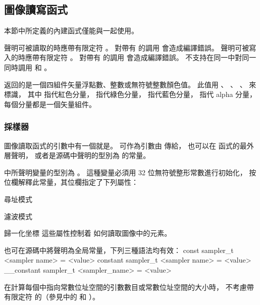 \subsection[section:imgRwFunc]{圖像讀寫函式}

本節中所定義的內建函式僅能與一起使用。

聲明可被讀取的時應帶有限定符 。
對帶有  的調用  會造成編譯錯誤。
聲明可被寫入的時應帶有限定符 。
對帶有  的調用  會造成編譯錯誤。
不支持在同一中對同一
同時調用  和 。

 返回的是一個四組件矢量浮點數、整數或無符號整數顏色值。
此值用 、 、 、  來標識，
其中  指代紅色分量，  指代綠色分量，  指代藍色分量，
  指代 alpha 分量，每個分量都是一個矢量組件。

\subsubsection[section:samplerInImgRw]{採樣器}

圖像讀取函式的引數中有一個就是。
可作為引數由  傳給，
也可以在  函式的最外層聲明，
或者是源碼中聲明的型別為  的常量。

中所聲明變量的型別為 。
這種變量必須用 32 位無符號整形常數進行初始化，
按位欄解釋此常量，其位欄指定了下列屬性：
\startigBase[indentnext=no]
\item 尋址模式
\item 濾波模式
\item 歸一化坐標
\stopigBase
這些屬性控制着  如何讀取圖像中的元素。

也可在源碼中將聲明為全局常量，下列三種語法均有效：
\startclc
const sampler_t		<sampler name> = <value>
constant sampler_t	<sampler name> = <value>
__constant sampler_t	<sampler_name> = <value>
\stopclc

\startnotepar
在計算每個中指向常數位址空間的引數數目或常數位址空間的大小時，
不考慮帶有限定符  的（參見中的
  和
 ）。
\stopnotepar

